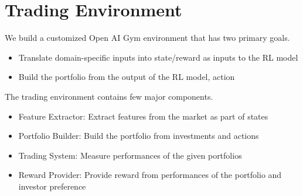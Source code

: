 \section{Trading Environment}
We build a customized Open AI Gym environment that has two primary goals.
\begin{itemize}
\itemsep -1em  
\item Translate domain-specific inputs into state/reward as inputs to the RL model
\item Build the portfolio from the output of the RL model, action
\end{itemize}
\par
The trading environment contains few major components.
\begin{itemize}
\itemsep -1em  
\item Feature Extractor: Extract features from the market as part of states
\item Portfolio Builder: Build the portfolio from investments and actions
\item Trading System: Measure performances of the given portfolios
\item Reward Provider: Provide reward from performances of the portfolio and investor preference
\end{itemize}